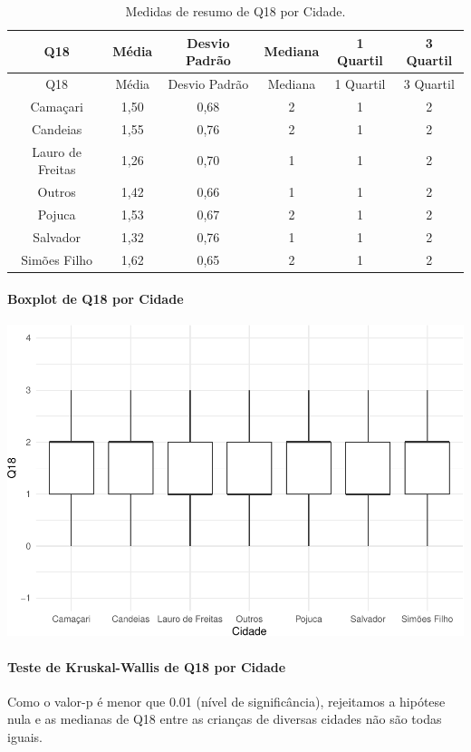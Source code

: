 \documentclass[]{article}
\let\oldparagraph\paragraph
\renewcommand{\paragraph}[1]{\oldparagraph{#1}\mbox{}}
\begin{document}
\begin{longtable}[]{@{}cccccc@{}}
\caption{\label{tab:unnamed-chunk-253}Medidas de resumo de Q18 por Cidade.}\tabularnewline
\toprule
Q18 & Média & Desvio Padrão & Mediana & 1 Quartil & 3 Quartil\tabularnewline
\midrule
\endfirsthead
\toprule
Q18 & Média & Desvio Padrão & Mediana & 1 Quartil & 3 Quartil\tabularnewline
\midrule
\endhead
Camaçari & 1,50 & 0,68 & 2 & 1 & 2\tabularnewline
Candeias & 1,55 & 0,76 & 2 & 1 & 2\tabularnewline
Lauro de Freitas & 1,26 & 0,70 & 1 & 1 & 2\tabularnewline
Outros & 1,42 & 0,66 & 1 & 1 & 2\tabularnewline
Pojuca & 1,53 & 0,67 & 2 & 1 & 2\tabularnewline
Salvador & 1,32 & 0,76 & 1 & 1 & 2\tabularnewline
Simões Filho & 1,62 & 0,65 & 2 & 1 & 2\tabularnewline
\bottomrule
\end{longtable}

\hypertarget{boxplot-de-q18-por-cidade}{%
\paragraph{Boxplot de Q18 por Cidade}\label{boxplot-de-q18-por-cidade}}

\begin{center}\includegraphics[width=0.75\linewidth]{relatorio_covid19_files/figure-latex/unnamed-chunk-254-1} \end{center}

\hypertarget{teste-de-kruskal-wallis-de-q18-por-cidade}{%
\paragraph{Teste de Kruskal-Wallis de Q18 por Cidade}\label{teste-de-kruskal-wallis-de-q18-por-cidade}}

Como o valor-p é menor que 0.01 (nível de significância), rejeitamos a hipótese nula e as medianas de Q18 entre as crianças de diversas cidades não são todas iguais.
\end{document}
